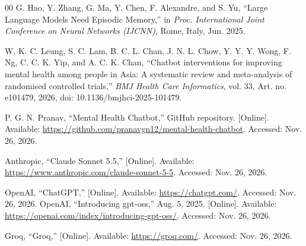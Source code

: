 \documentclass[conference]{IEEEtran}
\begin{document}
\begin{thebibliography}{00}
G. Hao, Y. Zhang, G. Ma, Y. Chen, F. Alexandre, and S. Yu,
``Large Language Models Need Episodic Memory,''
in \textit{Proc. International Joint Conference on Neural Networks (IJCNN)}, Rome, Italy, Jun. 2025.

W. K. C. Leung, S. C. Lam, B. C. L. Chan, J. N. L. Chow, Y. Y. Y. Wong, F. Ng, C. C. K. Yip, and A. C. K. Chan,
``Chatbot interventions for improving mental health among people in Asia: A systematic review and meta-analysis of randomised controlled trials,''
\textit{BMJ Health Care Informatics}, vol. 33, Art. no. e101479, 2026,
doi: 10.1136/bmjhci-2025-101479.

P. G. N. Pranav, ``Mental Health Chatbot,'' GitHub repository. [Online]. Available: \url{https://github.com/pranavgn12/mental-health-chatbot}. Accessed: Nov. 26, 2026.

Anthropic, ``Claude Sonnet 5.5,'' [Online]. Available: 
\url{https://www.anthropic.com/claude-sonnet-5-5}. Accessed: Nov. 26, 2026.

OpenAI, ``ChatGPT,'' [Online]. Available:
\url{https://chatgpt.com/}. Accessed: Nov. 26, 2026.
OpenAI, ``Introducing gpt-oss,'' Aug. 5, 2025. [Online]. Available:
\url{https://openai.com/index/introducing-gpt-oss/}. Accessed: Nov. 26, 2026.

Groq, ``Groq,'' [Online]. Available:
\url{https://groq.com/}. Accessed: Nov. 26, 2026.
\end{thebibliography}
\end{document}

